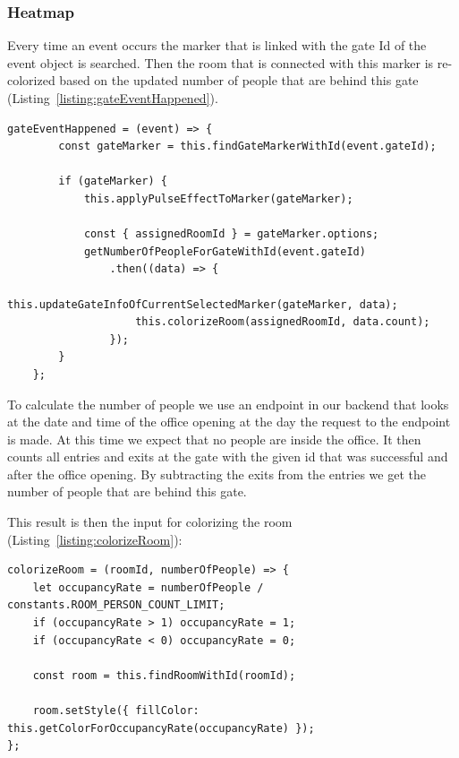 \subsubsection{Heatmap}

Every time an event occurs the marker that is linked with the gate Id of the event object is searched. Then the room that is connected with this marker is re-colorized based on the updated number of people that are behind this gate (Listing~\ref{listing:gateEventHappened}).

\clearpage

\begin{lstlisting}[label={listing:gateEventHappened},caption={Handling gate events in frontend}]
gateEventHappened = (event) => {
        const gateMarker = this.findGateMarkerWithId(event.gateId);

        if (gateMarker) {
            this.applyPulseEffectToMarker(gateMarker);

            const { assignedRoomId } = gateMarker.options;
            getNumberOfPeopleForGateWithId(event.gateId)
                .then((data) => {
                    this.updateGateInfoOfCurrentSelectedMarker(gateMarker, data);
                    this.colorizeRoom(assignedRoomId, data.count);
                });
        }
    };
\end{lstlisting}

To calculate the number of people we use an endpoint in our backend that looks at the date and time of the office opening at the day the request to the endpoint is made. At this time we expect that no people are inside the office. It then counts all entries and exits at the gate with the given id that was successful and after the office opening. By subtracting the exits from the entries we get the number of people that are behind this gate.

This result is then the input for colorizing the room (Listing~\ref{listing:colorizeRoom}):

\begin{lstlisting}[label={listing:colorizeRoom},caption={Function for colorizing a room}]
colorizeRoom = (roomId, numberOfPeople) => {
    let occupancyRate = numberOfPeople / constants.ROOM_PERSON_COUNT_LIMIT;
    if (occupancyRate > 1) occupancyRate = 1;
    if (occupancyRate < 0) occupancyRate = 0;

    const room = this.findRoomWithId(roomId);

    room.setStyle({ fillColor: this.getColorForOccupancyRate(occupancyRate) });
};
\end{lstlisting}

